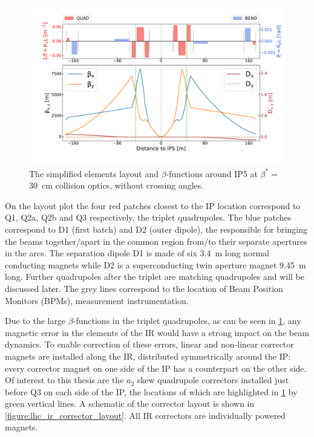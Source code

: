 \begin{figure}[!hbt]
  \centering
  \includegraphics*[width=0.99\linewidth]{Figures/Optics_Measurements_Corrections_at_LHC/lhc_ir5_zoomed.pdf}
  \caption{The simplified elements layout and \(\beta\)-functions around IP\num{5} at \(\beta^{\ast} =\) \qty{30}{\centi\metre} collision optics, without crossing angles.}
  \label{figure:lhc_ir5_zoomed}
\end{figure}

On the layout plot the four \textcolor{latwiss_red}{red patches} closest to the IP location correspond to Q\num{1}, Q\num{2}a, Q\num{2}b and Q\num{3} respectively, the triplet quadrupoles.
The \textcolor{latwiss_blue}{blue patches} correspond to D\num{1} (first batch) and D\num{2} (outer dipole), the  responsible for bringing the beams together/apart in the common region from/to their separate apertures in the arcs.
The separation dipole D\num{1} is made of six \qty{3.4}{\meter} long normal conducting magnets while D\num{2} is a superconducting twin aperture magnet \qty{9.45}{\meter} long.
Further quadrupoles after the triplet are matching quadrupoles and will be discussed later.
The grey lines correspond to the location of Beam Position Monitors (BPMs), measurement instrumentation.

Due to the large \(\beta\)-functions in the triplet quadrupoles, as can be seen in \cref{figure:lhc_ir5_zoomed}, any magnetic error in the elements of the IR would have a strong impact on the beam dynamics.
To enable correction of these errors, linear and non-linear corrector magnets are installed along the IR, distributed symmetrically around the IP: every corrector magnet on one side of the IP has a counterpart on the other side.
Of interest to this thesis are the \(a_2\) skew quadrupole correctors installed just before Q\num{3} on each side of the IP, the locations of which are highlighted in \cref{figure:lhc_ir5_zoomed} by \textcolor{mqsx_green}{green vertical lines}.
A schematic of the corrector layout is shown in \cref{figure:lhc_ir_corrector_layout}.
All IR correctors are individually powered magnets.

